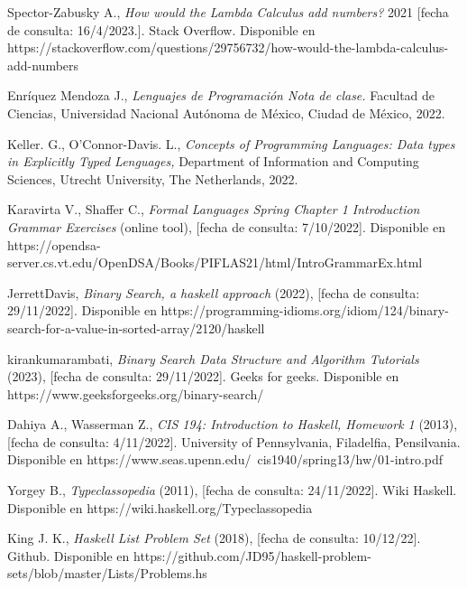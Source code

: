 \begin{thebibliography}{11}
    
    \label{sec:11}
    \hypertarget{11}{}
    Spector-Zabusky A., \textit{How would the Lambda Calculus add numbers?} 2021 [fecha de consulta: 16/4/2023.]. Stack Overflow. Disponible en https://stackoverflow.com/questions/29756732/how-would-the-lambda-calculus-add-numbers


    \label{sec:12}
    \hypertarget{12}{}
    Enríquez Mendoza J., \textit{Lenguajes de Programación Nota de clase.} Facultad de Ciencias, Universidad Nacional Autónoma de México, Ciudad de México, 2022.

    
    \label{sec:13}
    \hypertarget{13}{}
    Keller. G., O'Connor-Davis. L., \textit{Concepts of Programming Languages: Data types in Explicitly Typed Lenguages,} Department of Information and Computing Sciences, Utrecht University, The Netherlands,  2022.


    \label{sec:14}
    \hypertarget{14}{}
    Karavirta V., Shaffer C., \textit{Formal Languages Spring Chapter 1 Introduction Grammar Exercises} (online tool),  [fecha de consulta: 7/10/2022]. Disponible en https://opendsa-server.cs.vt.edu/OpenDSA/Books/PIFLAS21/html/IntroGrammarEx.html

    \label{sec:15}
    \hypertarget{15}{}
    JerrettDavis, \textit{Binary Search, a haskell approach} (2022), [fecha de consulta: 29/11/2022]. Disponible en https://programming-idioms.org/idiom/124/binary-search-for-a-value-in-sorted-array/2120/haskell

    \label{sec:16}
    \hypertarget{16}{}
    kirankumarambati, \textit{Binary Search Data Structure and Algorithm Tutorials} (2023), [fecha de consulta: 29/11/2022]. Geeks for geeks. Disponible en https://www.geeksforgeeks.org/binary-search/

    \label{sec:17}
    \hypertarget{17}{}
    Dahiya A., Wasserman Z., \textit{CIS 194: Introduction to Haskell,  Homework 1} (2013), [fecha de consulta: 4/11/2022]. University of Pennsylvania, Filadelfia, Pensilvania. Disponible en https://www.seas.upenn.edu/~cis1940/spring13/hw/01-intro.pdf

    \label{sec:18}
    \hypertarget{18}{}
    Yorgey B., \textit{Typeclassopedia} (2011), [fecha de consulta: 24/11/2022]. Wiki Haskell. Disponible en https://wiki.haskell.org/Typeclassopedia

    \bibitem{}
    \label{sec:19}
    \hypertarget{19}{}
    King J. K., \textit{Haskell List Problem Set} (2018), [fecha de consulta: 10/12/22]. Github. Disponible en https://github.com/JD95/haskell-problem-sets/blob/master/Lists/Problems.hs


\end{thebibliography}
